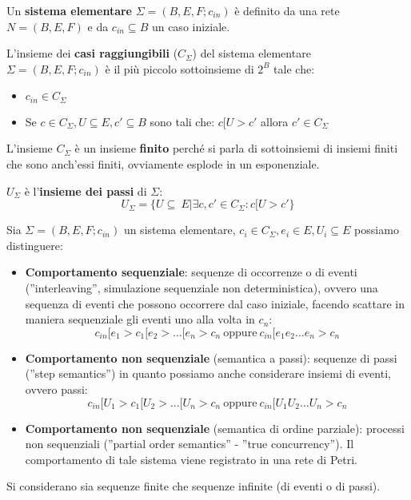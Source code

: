 Un \textbf{sistema elementare} $\Sigma = (B, E, F; c_{in})$ è definito da una rete
$N = (B, E, F)$ e da $c_{in} \subseteq B$ un caso iniziale.
\begin{definizione}
    L'insieme dei \textbf{casi raggiungibili} ($C_{\Sigma}$) del sistema elementare
    $\Sigma = (B, E, F; c_{in})$ è il più piccolo sottoinsieme di $2^B$ tale che:
    \begin{itemize}
        \item $c_{in} \in C_{\Sigma}$
        \item Se $c \in C_{\Sigma}, U \subseteq E, c' \subseteq B$ sono tali che:
              $c[U > c'$ allora $c' \in C_{\Sigma}$
    \end{itemize}
\end{definizione}
L'insieme $C_\Sigma$ è un insieme \textbf{finito} perché si parla di sottoinsiemi
di insiemi finiti che sono anch'essi finiti, ovviamente esplode in un esponenziale.
\begin{definizione}
    $U_{\Sigma}$ è l'\textbf{insieme dei passi} di $\Sigma$:
    \begin{equation}
        U_{\Sigma} = \{U \subseteq \ E | \exists c, c' \in C_{\Sigma}: c[U > c'\}
    \end{equation}
\end{definizione}
Sia $\Sigma = (B, E, F; c_{in})$ un sistema elementare,
$c_i \in C_{\Sigma}, e_i \in E, U_i \subseteq E$ possiamo distinguere:
\begin{itemize}
    \item \textbf{Comportamento sequenziale}: sequenze di occorrenze o di eventi
          (”interleaving”, simulazione sequenziale non deterministica), ovvero una
          sequenza di eventi che possono occorrere dal caso iniziale, facendo scattare
          in maniera sequenziale gli eventi uno alla volta in $c_n$:
          \begin{equation}
              c_{in}[e_1 > c_1[e_2 > \dots [e_n > c_n \ \text{oppure} \
              c_{in}[e_1e_2 \dots e_n > c_n
          \end{equation}
    \item \textbf{Comportamento non sequenziale} (semantica a passi): sequenze di
          passi (”step semantics”) in quanto possiamo anche considerare insiemi
          di eventi, ovvero passi:
          \begin{equation}
              c_{in}[U_1 > c_1[U_2 > \dots [U_n > c_n \ \text{oppure} \
              c_{in}[U_1U_2 \dots U_n > c_n
          \end{equation}
    \item \textbf{Comportamento non sequenziale}  (semantica di ordine parziale):
          processi non sequenziali (”partial order semantics” - ”true concurrency”).
          Il comportamento di tale sistema viene registrato in una rete di Petri.
\end{itemize}
Si considerano sia sequenze finite che sequenze infinite (di eventi o di passi).

